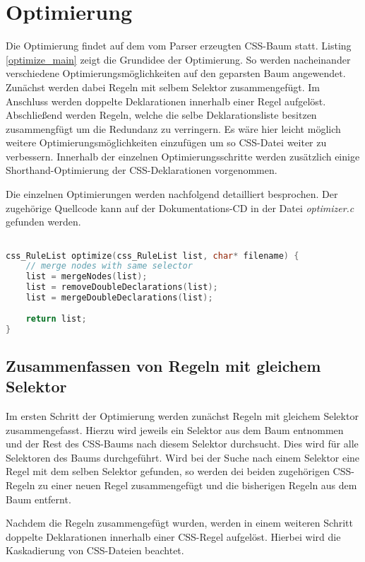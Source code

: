 \section{Optimierung}\label{chap_optimization}
Die Optimierung findet auf dem vom Parser erzeugten CSS-Baum statt. Listing \ref{optimize_main} zeigt die Grundidee der Optimierung. So werden nacheinander verschiedene Optimierungsmöglichkeiten auf den geparsten Baum angewendet.
Zunächst werden dabei Regeln mit selbem Selektor zusammengefügt. Im Anschluss werden doppelte Deklarationen innerhalb einer Regel aufgelöst. Abschließend werden Regeln, welche die selbe Deklarationsliste besitzen zusammengfügt um die Redundanz zu verringern.
Es wäre hier leicht möglich weitere Optimierungsmöglichkeiten einzufügen um so CSS-Datei weiter zu verbessern.
Innerhalb der einzelnen Optimierungsschritte werden zusätzlich einige Shorthand-Optimierung der CSS-Deklarationen vorgenommen.

Die einzelnen Optimierungen werden nachfolgend detailliert besprochen. Der zugehörige Quellcode kann auf der Dokumentations-CD in der Datei \textit{optimizer.c} gefunden werden.

\begin{lstlisting}[label=optimize_main,language=C, caption=Optimize-Funktion]

css_RuleList optimize(css_RuleList list, char* filename) {
	// merge nodes with same selector
	list = mergeNodes(list);
	list = removeDoubleDeclarations(list);
	list = mergeDoubleDeclarations(list);
	
	return list;
}

\end{lstlisting}


\subsection{Zusammenfassen von Regeln mit gleichem Selektor}
Im ersten Schritt der Optimierung werden zunächst Regeln mit gleichem Selektor zusammengefasst. Hierzu wird jeweils ein Selektor aus dem Baum entnommen und der Rest des CSS-Baums nach diesem Selektor durchsucht. Dies wird für alle Selektoren des Baums durchgeführt.
Wird bei der Suche nach einem Selektor eine Regel mit dem selben Selektor gefunden, so werden dei beiden zugehörigen CSS-Regeln zu einer neuen Regel zusammengefügt und die bisherigen Regeln aus dem Baum entfernt.

Nachdem die Regeln zusammengefügt wurden, werden in einem weiteren Schritt doppelte Deklarationen innerhalb einer CSS-Regel aufgelöst. Hierbei wird die Kaskadierung von CSS-Dateien beachtet.

